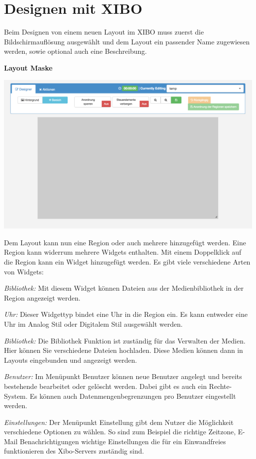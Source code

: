 \section{Designen mit XIBO}\label{sec:designexibo}
Beim Designen von einem neuen Layout im XIBO muss zuerst die Bildschirmauflösung ausgewählt und dem Layout ein passender Name zugewiesen werden, sowie optional auch eine Beschreibung. 

\textbf{Layout Maske}

\begin{calendar}
	\centering
\includegraphics[width=1\textwidth]{images/xibo-basics-designer}
	\label{Calendar}
\end{calendar}	

Dem Layout kann nun eine Region oder auch mehrere  hinzugefügt werden. Eine Region kann widerrum mehrere Widgets enthalten. Mit einem Doppelklick auf die Region kann ein Widget hinzugefügt werden. Es gibt viele verschiedene Arten von Widgets:

\begin{widgettypes}
	\item {\em Bibliothek:} Mit diesem Widget können Dateien aus der Medienbibliothek in der Region angezeigt werden.
	
	\item {\em Uhr:} 
	Dieser Widgettyp bindet eine Uhr in die Region ein. Es kann entweder eine Uhr im Analog Stil oder Digitalem Stil ausgewählt werden.
	
	\item {\em Bibliothek:} 
	Die Bibliothek Funktion ist zuständig für das Verwalten der Medien. Hier können Sie verschiedene Dateien hochladen.  Diese Medien können dann in Layouts eingebunden und angezeigt werden.
	
	\item {\em Benutzer:} 
	Im Menüpunkt Benutzer können neue Benutzer angelegt und bereits bestehende bearbeitet oder gelöscht werden. Dabei gibt es auch ein Rechte-System. Es können auch Datenmengenbegrenzungen pro Benutzer eingestellt werden.
	
	\item {\em Einstellungen:} 
	Der Menüpunkt Einstellung gibt dem Nutzer die Möglichkeit verschiedene Optionen zu wählen. So sind zum Beispiel die richtige Zeitzone, E-Mail Benachrichtigungen wichtige Einstellungen die für ein Einwandfreies funktionieren des Xibo-Servers zuständig sind.
\end{widgettypes}
